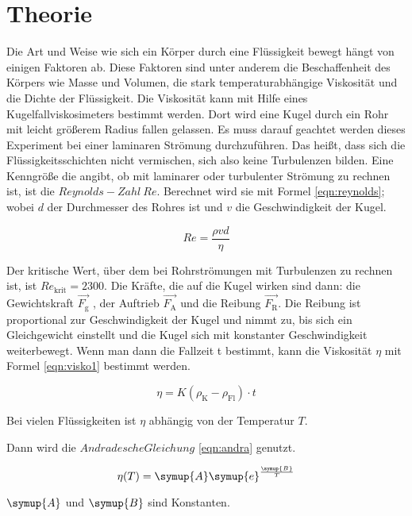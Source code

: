 \section{Theorie}
\label{sec:Theorie}

Die Art und Weise wie sich ein Körper durch eine Flüssigkeit
bewegt hängt von einigen Faktoren ab. Diese Faktoren sind unter anderem
 die Beschaffenheit des Körpers wie Masse und Volumen, die stark temperaturabhängige
Viskosität und die Dichte der Flüssigkeit.
Die  Viskosität kann mit Hilfe eines Kugelfallviskosimeters bestimmt werden.
Dort wird eine Kugel durch ein Rohr mit leicht größerem Radius fallen gelassen.
Es muss darauf geachtet werden dieses Experiment bei einer laminaren
Strömung durchzuführen. Das heißt, dass sich die Flüssigkeitsschichten nicht
vermischen, sich also keine Turbulenzen bilden.
Eine Kenngröße die angibt, ob mit laminarer oder turbulenter Strömung
zu rechnen ist, ist die $Reynolds-Zahl~Re$. Berechnet wird sie mit Formel
\eqref{eqn:reynolds}; wobei $d$ der Durchmesser des Rohres ist und $v$
die Geschwindigkeit der Kugel.

\begin{equation}
  Re = \frac{\rho v d}{\eta}
  \label{eqn:reynolds}
\end{equation}

Der kritische Wert, über dem bei Rohrströmungen mit Turbulenzen zu rechnen
ist, ist $Re_{\text{krit}} = 2300$.
Die Kräfte, die auf die Kugel wirken sind dann: die Gewichtskraft $\vec{F_{\text{g}}}$
, der Auftrieb $\vec{F_{\text{A}}}$ und die Reibung $\vec{F_{\text{R}}}$.
Die Reibung ist proportional zur Geschwindigkeit der Kugel und nimmt zu, bis
sich ein Gleichgewicht einstellt und die Kugel sich mit konstanter Geschwindigkeit
weiterbewegt.
Wenn man dann die Fallzeit t bestimmt, kann die Viskosität $\eta$ mit Formel
\eqref{eqn:visko1} bestimmt werden.

\begin{equation}
  \eta = K (\rho_{\text{K}}-\rho_{\text{Fl}}) \cdot t
  \label{eqn:visko1}
\end{equation}

Bei vielen Flüssigkeiten ist $\eta$ abhängig von der Temperatur $T$.

Dann
wird die $Andradesche Gleichung$ \eqref{eqn:andra} genutzt.

\begin{equation}
  \eta(T) = \symup{A} \symup{e}^{\frac{\symup{B}}{T}}
  \label{eqn:andra}
\end{equation}

$\symup{A}$ und $\symup{B}$ sind Konstanten.

